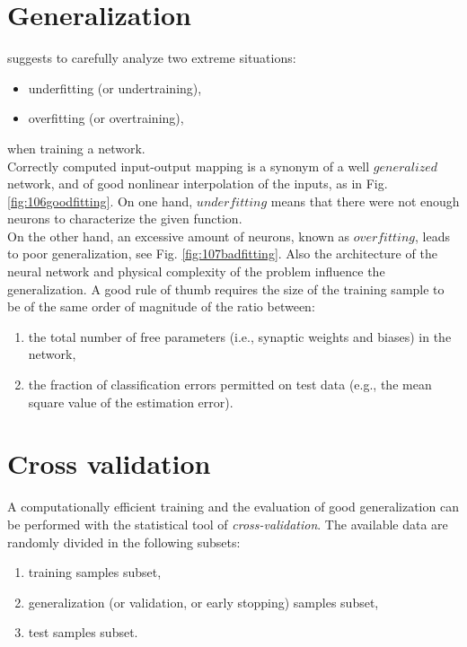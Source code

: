 \section{Generalization}
\label{sec:generalization}



\citet {RefWorks:158} suggests to carefully analyze two extreme situations:
\begin{itemize}
  \item {underfitting (or undertraining),}
  \item {overfitting (or overtraining),}
\end{itemize}
when training a network.\\
Correctly computed input-output mapping is a synonym of a well $generalized$
network, and of good nonlinear interpolation of the inputs, as in Fig. 
\ref{fig:106goodfitting}. 
On one hand, $underfitting$ means that there were not enough neurons to
characterize the given function.\\
On the other hand, an excessive amount of
neurons, known as $overfitting$, leads to poor generalization, see 
Fig. \ref{fig:107badfitting}. Also the architecture of the neural network and
physical complexity of the problem influence the generalization.
A good rule of thumb requires the size of the training sample to be of the same
order of magnitude of the ratio between:
\begin{enumerate}[label=(\alph*)]
  \item{the total number of free parameters (i.e., synaptic weights and biases)
  in the network,}
  \item{the fraction of classification errors permitted on test data (e.g., the
  mean square value of the estimation error).}
\end{enumerate}

\section{Cross validation}
\label{sec:crossvalidation}

A computationally efficient training and the evaluation of good generalization
can be performed with the statistical tool of \textit{cross-validation}.
The available data are randomly divided in the following subsets:

\begin{enumerate}
  \item{training samples subset,}
  \item{generalization (or validation, or early stopping) samples subset,}
  \item{test samples subset.}
\end{enumerate}

